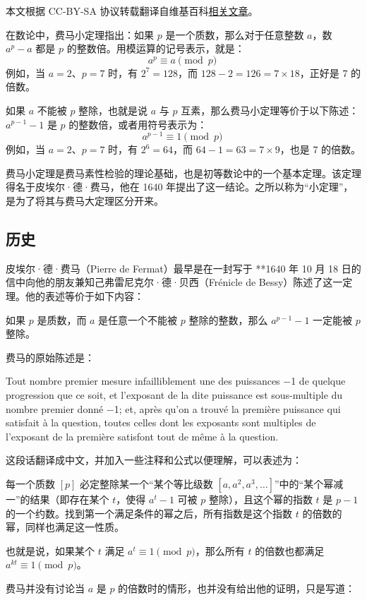 
本文根据 CC-BY-SA 协议转载翻译自维基百科\href{https://en.wikipedia.org/wiki/Fermat\%27s_little_theorem}{相关文章}。

在数论中，费马小定理指出：如果 $p$ 是一个质数，那么对于任意整数 $a$，数 $a^p - a$ 都是 $p$ 的整数倍。用模运算的记号表示，就是：
$$
a^p \equiv a \pmod{p}~
$$
例如，当 $a = 2$、$p = 7$ 时，有 $2^7 = 128$，而 $128 - 2 = 126 = 7 \times 18$，正好是 7 的倍数。

如果 $a$ 不能被 $p$ 整除，也就是说 $a$ 与 $p$ 互素，那么费马小定理等价于以下陈述：$a^{p-1} - 1$ 是 $p$ 的整数倍，或者用符号表示为：
$$
a^{p-1} \equiv 1 \pmod{p}~
$$
例如，当 $a = 2$、$p = 7$ 时，有 $2^6 = 64$，而 $64 - 1 = 63 = 7 \times 9$，也是 7 的倍数。

费马小定理是费马素性检验的理论基础，也是初等数论中的一个基本定理。该定理得名于皮埃尔·德·费马，他在 1640 年提出了这一结论。之所以称为“小定理”，是为了将其与费马大定理区分开来。
\subsection{历史}
皮埃尔·德·费马（Pierre de Fermat）最早是在一封写于 **1640 年 10 月 18 日的信中向他的朋友兼知己弗雷尼克尔·德·贝西（Frénicle de Bessy）陈述了这一定理。他的表述等价于如下内容：

如果 $p$ 是质数，而 $a$ 是任意一个不能被 $p$ 整除的整数，那么 $a^{p-1} - 1$ 一定能被 $p$ 整除。

费马的原始陈述是：

Tout nombre premier mesure infailliblement une des puissances −1 de quelque progression que ce soit, et l'exposant de la dite puissance est sous-multiple du nombre premier donné −1; et, après qu'on a trouvé la première puissance qui satisfait à la question, toutes celles dont les exposants sont multiples de l'exposant de la première satisfont tout de même à la question.

这段话翻译成中文，并加入一些注释和公式以便理解，可以表述为：

每一个质数 $[p]$ 必定整除某一个“某个等比级数 $[a, a^2, a^3, \dots]$”中的“某个幂减一”的结果（即存在某个 $t$，使得 $a^t - 1$ 可被 $p$ 整除），且这个幂的指数 $t$ 是 $p - 1$ 的一个约数。找到第一个满足条件的幂之后，所有指数是这个指数 $t$ 的倍数的幂，同样也满足这一性质。

也就是说，如果某个 $t$ 满足 $a^t \equiv 1 \pmod{p}$，那么所有 $t$ 的倍数也都满足 $a^{kt} \equiv 1 \pmod{p}$。

费马并没有讨论当 $a$ 是 $p$ 的倍数时的情形，也并没有给出他的证明，只是写道：

